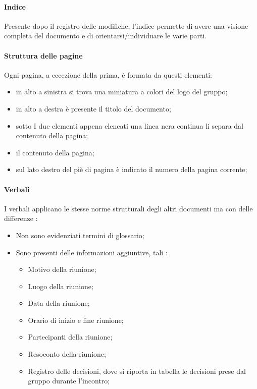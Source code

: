 \paragraph{Indice}
Presente dopo il registro delle modifiche, l’indice permette di avere una visione completa del documento e di orientarsi/individuare le varie parti.

\paragraph{Struttura delle pagine}
Ogni pagina, a eccezione della prima, è formata da questi elementi:
  \begin{itemize}
  		\item in alto a sinistra si trova una miniatura a colori del logo del gruppo;
  		\item in alto a destra è presente il titolo del documento;
  		\item sotto I due elementi appena elencati una linea nera continua li separa dal contenuto della pagina;
  		\item il contenuto della pagina;
  		\item sul lato destro del piè di pagina è indicato il numero della pagina corrente;
	\end{itemize}
	
\paragraph{Verbali}
I verbali applicano le stesse norme strutturali degli altri documenti ma con delle differenze :
  \begin{itemize}
  		\item Non sono evidenziati termini di glossario;
  		\item Sono presenti delle informazioni aggiuntive, tali :
  		\begin{itemize}
  		\item Motivo della riunione;
  		\item Luogo della riunione;
  		\item Data della riunione;
  		\item Orario di inizio e fine riunione;
  		\item Partecipanti della riunione;
  		\item Resoconto della riunione;
  		\item Registro delle decisioni, dove si riporta in tabella le decisioni prese dal gruppo durante l’incontro;
  		\end{itemize}  		
	\end{itemize}
	
